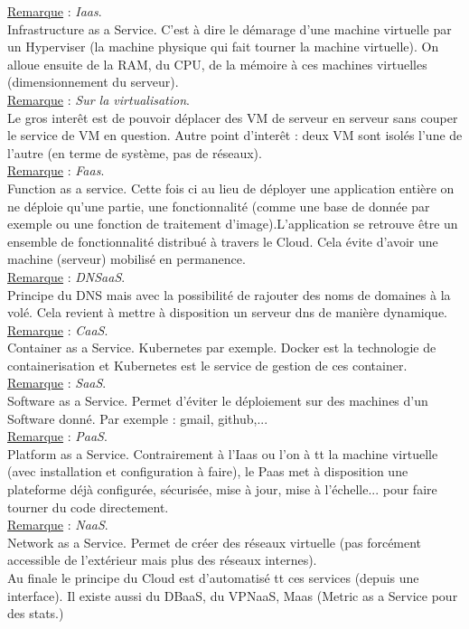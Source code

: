 \documentclass[a4paper,12pt,twoside]{article}
\newcommand{\rem}[2]{\noindent\underline{Remarque} : \textit{#1}.\\ \indent #2}
\begin{document}
\rem{Iaas}{Infrastructure as a Service. C'est à dire le démarage d'une machine virtuelle par un Hyperviser (la machine physique qui fait tourner la machine virtuelle). On alloue ensuite de la RAM, du CPU, de la mémoire à ces machines virtuelles (dimensionnement du serveur).}\\

\rem{Sur la virtualisation}{Le gros interêt est de pouvoir déplacer des VM de serveur en serveur sans couper le service de VM en question. Autre point d'interêt : deux VM sont isolés l'une de l'autre (en terme de système, pas de réseaux).}\\

\rem{Faas}{Function as a service. Cette fois ci au lieu de déployer une application entière on ne déploie qu'une partie, une fonctionnalité (comme une base de donnée par exemple ou une fonction de traitement d'image).L'application se retrouve être un ensemble de fonctionnalité distribué à travers le Cloud. Cela évite d'avoir une machine (serveur) mobilisé en permanence.}\\

\rem{DNSaaS}{Principe du DNS mais avec la possibilité de rajouter des noms de domaines à la volé. Cela revient à mettre à disposition un serveur dns de manière dynamique.}\\

\rem{CaaS}{Container as a Service. Kubernetes par exemple. Docker est la technologie de containerisation et Kubernetes est le service de gestion de ces container.}\\

\rem{SaaS}{Software as a Service. Permet d'éviter le déploiement sur des machines d'un Software donné. Par exemple : gmail, github,...}\\

\rem{PaaS}{Platform as a Service. Contrairement à l'Iaas ou l'on à tt la machine virtuelle (avec installation et configuration à faire), le Paas met à disposition une plateforme déjà configurée, sécurisée, mise à jour, mise à l'échelle... pour faire tourner du code directement.}\\

\rem{NaaS}{Network as a Service. Permet de créer des réseaux virtuelle (pas forcément accessible de l'extérieur mais plus des réseaux internes).}\\

Au finale le principe du Cloud est d'automatisé tt ces services (depuis une interface). Il existe aussi du DBaaS, du VPNaaS, Maas (Metric as a Service pour des stats.)\\
\end{document}
